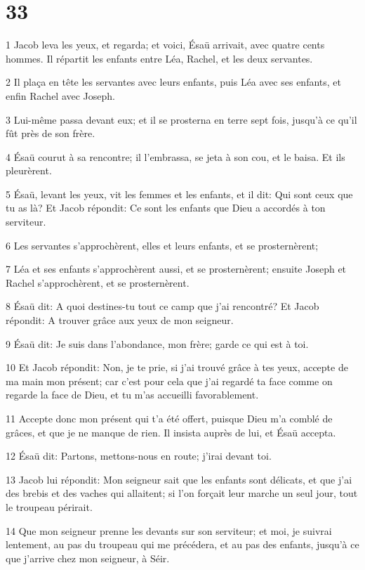 \chapter{33}

\par 1 Jacob leva les yeux, et regarda; et voici, Ésaü arrivait, avec quatre cents hommes. Il répartit les enfants entre Léa, Rachel, et les deux servantes.
\par 2 Il plaça en tête les servantes avec leurs enfants, puis Léa avec ses enfants, et enfin Rachel avec Joseph.
\par 3 Lui-même passa devant eux; et il se prosterna en terre sept fois, jusqu'à ce qu'il fût près de son frère.
\par 4 Ésaü courut à sa rencontre; il l'embrassa, se jeta à son cou, et le baisa. Et ils pleurèrent.
\par 5 Ésaü, levant les yeux, vit les femmes et les enfants, et il dit: Qui sont ceux que tu as là? Et Jacob répondit: Ce sont les enfants que Dieu a accordés à ton serviteur.
\par 6 Les servantes s'approchèrent, elles et leurs enfants, et se prosternèrent;
\par 7 Léa et ses enfants s'approchèrent aussi, et se prosternèrent; ensuite Joseph et Rachel s'approchèrent, et se prosternèrent.
\par 8 Ésaü dit: A quoi destines-tu tout ce camp que j'ai rencontré? Et Jacob répondit: A trouver grâce aux yeux de mon seigneur.
\par 9 Ésaü dit: Je suis dans l'abondance, mon frère; garde ce qui est à toi.
\par 10 Et Jacob répondit: Non, je te prie, si j'ai trouvé grâce à tes yeux, accepte de ma main mon présent; car c'est pour cela que j'ai regardé ta face comme on regarde la face de Dieu, et tu m'as accueilli favorablement.
\par 11 Accepte donc mon présent qui t'a été offert, puisque Dieu m'a comblé de grâces, et que je ne manque de rien. Il insista auprès de lui, et Ésaü accepta.
\par 12 Ésaü dit: Partons, mettons-nous en route; j'irai devant toi.
\par 13 Jacob lui répondit: Mon seigneur sait que les enfants sont délicats, et que j'ai des brebis et des vaches qui allaitent; si l'on forçait leur marche un seul jour, tout le troupeau périrait.
\par 14 Que mon seigneur prenne les devants sur son serviteur; et moi, je suivrai lentement, au pas du troupeau qui me précédera, et au pas des enfants, jusqu'à ce que j'arrive chez mon seigneur, à Séir.
